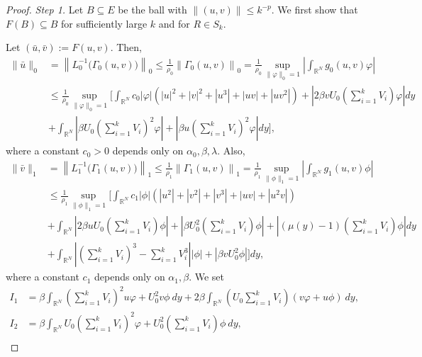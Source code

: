 \documentclass{amsart}
\theoremstyle{definition}
\theoremstyle{remark}
\numberwithin{equation}{section}
\begin{document}
\begin{proof}
\textit{Step 1.} Let $B \subseteq E$ be the ball with $\|(u,v)\| \le k^{-p}$. We first show that   $F(B) \subseteq B$ for sufficiently large $k$  and for $R \in S_k$.

Let $(\bar u, \bar v) := F(u,v)$. Then,
 \begin{align*}
  \|\bar u\|_0 &= \left\|L_0^{-1}\Big(\Gamma_0(u,v)\Big)\right\|_0 \le \frac{1}{\rho_0}\left\|\Gamma_0(u,v)\right\|_0 = \frac{1}{\rho_0} \sup_{\|\varphi\|_0=1} \left| \int_{ \mathbb{R}^N} g_0(u,v) \varphi \right|\\
  &\le  {\frac{1}{\rho_0}} \sup_{\|\varphi\|_0=1} \Bigg[   {\int_{ \mathbb{R}^N} c_0}|\varphi| \left( |u|^2 +|v|^2 + |u^3| + |uv| + |uv^2|\right) + \left|  {2}\beta v U_0\left(\sum_{i=1}^k V_{i}\right)\varphi\right|dy\\
  & +  {\int_{ \mathbb{R}^N} }  \left|\beta U_0\left(\sum_{i=1}^k V_{i}\right)^2\varphi\right| +  \left|\beta u\left(\sum_{i=1}^k V_{i}\right)^2\varphi\right|dy\Bigg],
 \end{align*}
 where a constant $c_0>0$ depends only on $\alpha_0, \beta, \lambda$. Also,
 \begin{align*}
  \|\bar v\|_1 &= \left\|L_1^{-1}\Big(\Gamma_1(u,v)\Big)\right\|_1 \le \frac{1}{\rho_1}\left\|\Gamma_1(u,v)\right\|_1 = \frac{1}{\rho_1} \sup_{\|\phi\|_1=1} \left| \int_{ \mathbb{R}^N} g_1(u,v) \phi \right|\\
  &\le  {\frac{1}{\rho_1}}\sup_{\|\phi\|_1=1} \Bigg[  {\int_{ \mathbb{R}^N} c_1} |\phi|\left( |u^2| + |v^2|+ |v^3| + |uv| +|u^2v|\right)  \\
  &+ \int_{\mathbb{R}^N} \left| {2} \beta u U_0\left(\sum_{i=1}^k V_{i}\right)\phi\right| + \left|\beta U_0^2\left(\sum_{i=1}^k V_{i}\right)\phi\right| + \left|(\mu(y)-1)\left(\sum_{i=1}^k V_{i}\right)\phi\right|dy\\
  &  + \int_{\mathbb{R}^N}\left|\left(\sum_{i=1}^k V_{i}\right)^3 - \sum_{i=1}^k V_{i}^3 \right| |\phi| + \left|\beta v U_0^2  \phi\right| \Bigg]dy,
 \end{align*}
 where a constant $c_1$ depends only on $\alpha_1, \beta$.  
We set
\begin{align*}
 I_1 &= \beta \int_{\mathbb{R}^N} \left(\sum_{i=1}^k V_{i}\right)^2 u\varphi + U_0^2 v\phi \:dy + 2\beta\int_{\mathbb{R}^N} \left(U_0\sum_{i=1}^k V_i\right)(v\varphi + u\phi) \:dy, \\
 I_2 &= \beta\int_{\mathbb{R}^N} U_0\left(\sum_{i=1}^k V_{i}\right)^2\varphi + U_0^2\left(\sum_{i=1}^k V_{i}\right)\phi \: dy,\\

\end{align*}
\end{proof}
\end{document}
